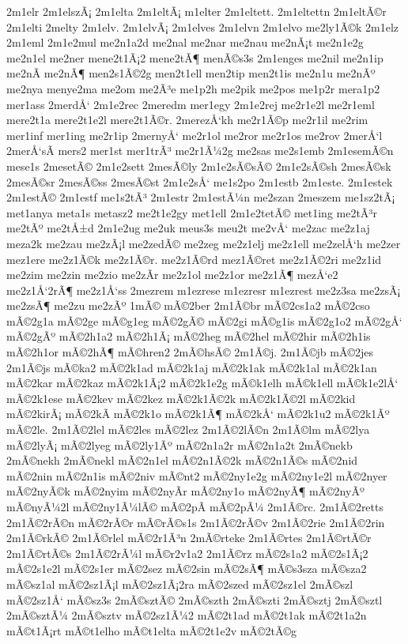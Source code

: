 {2m1elr
2m1elszÃ¡
2m1elta
2m1eltÃ¡
m1elter
2m1eltett.
2m1eltettn
2m1eltÃ©r
2m1elti
2melty
2m1elv.
2m1elvÃ¡
2m1elves
2m1elvn
2m1elvo
me2ly1Ã©k
2m1elz
2m1eml
2m1e2mul
me2n1a2d
me2nal
me2nar
me2nau
me2nÃ¡t
me2n1e2g
me2n1el
me2ner
mene2t1Ã¡2
mene2tÃ¶
menÃ©s3s
2m1enges
me2nil
me2n1ip
me2nÃ­
me2nÃ¶
men2s1Ã©2g
men2t1ell
men2tip
men2t1is
me2n1u
me2nÃº
me2nya
menye2ma
me2om
me2Ã³e
me1p2h
me2pik
me2pos
me1p2r
mera1p2
mer1ass
2merdÅ‘
2m1e2rec
2meredm
mer1egy
2m1e2rej
me2r1e2l
me2r1eml
mere2t1a
mere2t1e2l
mere2t1Ã©r.
2merezÅ‘kh
me2r1Ã©p
me2r1il
me2rim
mer1inf
mer1ing
me2r1ip
2mernyÅ‘
me2r1ol
me2ror
me2r1os
me2rov
2merÅ‘l
2merÅ‘sÃ­
mers2
mer1st
mer1trÃ³
me2r1Ã¼2g
me2sas
me2s1emb
2m1esemÃ©n
mese1s
2mesetÃ©
2m1e2sett
2mesÃ©ly
2m1e2sÃ©sÃ©
2m1e2sÃ©sh
2mesÃ©sk
2mesÃ©sr
2mesÃ©ss
2mesÃ©st
2m1e2sÅ‘
me1s2po
2m1estb
2m1este.
2m1estek
2m1estÃ©
2m1estf
me1s2tÃ³
2m1estr
2m1estÃ¼n
me2szan
2meszem
me1sz2tÃ¡
met1anya
meta1s
metasz2
me2t1e2gy
met1ell
2m1e2tetÃ©
met1ing
me2tÃ³r
me2tÃº
me2tÅ±d
2m1e2ug
me2uk
meus3s
meu2t
me2vÅ‘
me2zac
me2z1aj
meza2k
me2zau
me2zÃ¡l
me2zedÃ©
me2zeg
me2z1elj
me2z1ell
me2zelÅ‘h
me2zer
mez1ere
me2z1Ã©k
me2z1Ã©r.
me2z1Ã©rd
mez1Ã©ret
me2z1Ã©2ri
me2z1id
me2zim
me2zin
me2zio
me2zÃ­r
me2z1ol
me2z1or
me2z1Ã¶
mezÅ‘e2
me2z1Å‘2rÃ¶
me2z1Å‘ss
2mezrem
m1ezrese
m1ezresr
m1ezrest
me2z3sa
me2zsÃ¡
me2zsÃ¶
me2zu
me2zÃº
1mÃ©
mÃ©2ber
2m1Ã©br
mÃ©2cs1a2
mÃ©2cso
mÃ©2g1a
mÃ©2ge
mÃ©g1eg
mÃ©2gÃ©
mÃ©2gi
mÃ©g1is
mÃ©2g1o2
mÃ©2gÅ‘
mÃ©2gÃº
mÃ©2h1a2
mÃ©2h1Ã¡
mÃ©2heg
mÃ©2hel
mÃ©2hir
mÃ©2h1is
mÃ©2h1or
mÃ©2hÃ¶
mÃ©hren2
2mÃ©hsÃ©
2m1Ã©j.
2m1Ã©jb
mÃ©2jes
2m1Ã©js
mÃ©ka2
mÃ©2k1ad
mÃ©2k1aj
mÃ©2k1ak
mÃ©2k1al
mÃ©2k1an
mÃ©2kar
mÃ©2kaz
mÃ©2k1Ã¡2
mÃ©2k1e2g
mÃ©k1elh
mÃ©k1ell
mÃ©k1e2lÅ‘
mÃ©2k1ese
mÃ©2kev
mÃ©2kez
mÃ©2k1Ã©2k
mÃ©2k1Ã©2l
mÃ©2kid
mÃ©2kirÃ¡
mÃ©2kÃ­
mÃ©2k1o
mÃ©2k1Ã¶
mÃ©2kÅ‘
mÃ©2k1u2
mÃ©2k1Ãº
mÃ©2le.
2m1Ã©2lel
mÃ©2les
mÃ©2lez
2m1Ã©2lÃ©n
2m1Ã©lm
mÃ©2lya
mÃ©2lyÃ¡
mÃ©2lyeg
mÃ©2ly1Ãº
mÃ©2n1a2r
mÃ©2n1a2t
2mÃ©nekb
2mÃ©nekh
2mÃ©nekl
mÃ©2n1el
mÃ©2n1Ã©2k
mÃ©2n1Ã©s
mÃ©2nid
mÃ©2nin
mÃ©2n1is
mÃ©2niv
mÃ©nt2
mÃ©2ny1e2g
mÃ©2ny1e2l
mÃ©2nyer
mÃ©2nyÃ©k
mÃ©2nyim
mÃ©2nyÃ­r
mÃ©2ny1o
mÃ©2nyÃ¶
mÃ©2nyÃº
mÃ©nyÃ¼2l
mÃ©2ny1Ã¼lÃ©
mÃ©2pÃ­
mÃ©2pÃ¼
2m1Ã©rc.
2m1Ã©2retts
2m1Ã©2rÃ©n
mÃ©2rÃ©r
mÃ©rÃ©s1s
2m1Ã©2rÃ©v
2m1Ã©2rie
2m1Ã©2rin
2m1Ã©rkÃ©
2m1Ã©rlel
mÃ©2r1Ã³n
2mÃ©rteke
2m1Ã©rtes
2m1Ã©rtÃ©r
2m1Ã©rtÃ©s
2m1Ã©2rÃ¼l
mÃ©r2v1a2
2m1Ã©rz
mÃ©2s1a2
mÃ©2s1Ã¡2
mÃ©2s1e2l
mÃ©2s1er
mÃ©2sez
mÃ©2sin
mÃ©2sÃ¶
mÃ©s3sza
mÃ©sza2
mÃ©sz1al
mÃ©2sz1Ã¡l
mÃ©2sz1Ã¡2ra
mÃ©2szed
mÃ©2sz1el
2mÃ©szl
mÃ©2sz1Å‘
mÃ©sz3s
2mÃ©sztÃ©
2mÃ©szth
2mÃ©szti
2mÃ©sztj
2mÃ©sztl
2mÃ©sztÃ¼
2mÃ©sztv
mÃ©2sz1Ã¼2
mÃ©2t1ad
mÃ©2t1ak
mÃ©2t1a2n
mÃ©t1Ã¡rt
mÃ©t1elho
mÃ©t1elta
mÃ©2t1e2v
mÃ©2tÃ©g
}
